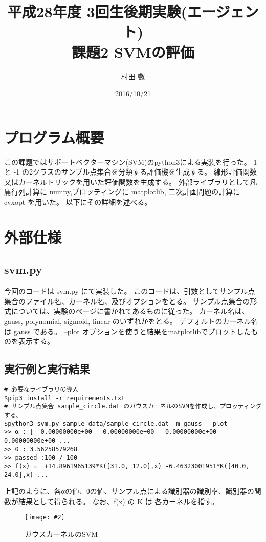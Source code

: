 \documentclass[]{jsarticle}
\newcommand*{\graphc}[3][7.0cm]{\begin{figure}[h] \begin{center}\texttt{[image: \#2]}\caption{#3}\end{center}\end{figure}}
\begin{document}
\title{平成28年度 3回生後期実験(エージェント) \\ 課題2 SVMの評価 }
\author{村田 叡}
\date{ 2016/10/21 }
\maketitle

\section{プログラム概要}
この課題ではサポートベクターマシン(SVM)のpython3による実装を行った。
1 と -1 の2クラスのサンプル点集合を分類する評価機を生成する。
線形評価関数又はカーネルトリックを用いた評価関数を生成する。
外部ライブラリとして凡庸行列計算に numpy,プロッティングに matplotlib,
二次計画問題の計算に cvxopt を用いた。
以下にその詳細を述べる。


\section{外部仕様}

\subsection{svm.py}
今回のコードは svm.py にて実装した。
このコードは、引数としてサンプル点集合のファイル名、カーネル名、及びオプションをとる。
サンプル点集合の形式については、実験のページに書かれてあるものに従った。
カーネル名は、gauss, polynomial, sigmoid, linear のいずれかをとる。
デフォルトのカーネル名は gauss である。
--plot オプションを使うと結果をmatplotlibでプロットしたものを表示する。

\subsection{実行例と実行結果}
\begin{verbatim}
# 必要なライブラリの導入
$pip3 install -r requirements.txt
# サンプル点集合 sample_circle.dat のガウスカーネルのSVMを作成し、プロッティングする。
$python3 svm.py sample_data/sample_circle.dat -m gauss --plot
>> α : [  0.00000000e+00   0.00000000e+00   0.00000000e+00   0.00000000e+00 ...
>> θ : 3.56258579268
>> passed :100 / 100
>> f(x) =  +14.8961965139*K([31.0, 12.0],x) -6.46323001951*K([40.0, 24.0],x) ...
\end{verbatim}
上記のように、各αの値、θの値、サンプル点による識別器の識別率、識別器の関数が結果として得られる。
なお、f(x) の K は 各カーネルを指す。
\graphc[16cm]{./images/circleplot.png}{ガウスカーネルのSVM}
\end{document}
